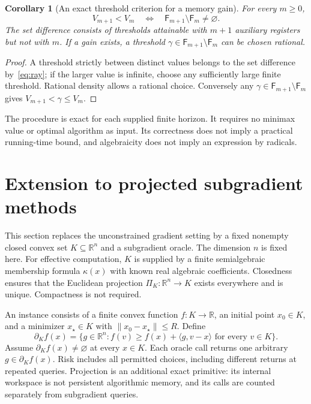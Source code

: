 \documentclass[11pt]{article}
\numberwithin{equation}{section}
\newtheorem{corollary}[theorem]{Corollary}
\theoremstyle{definition}
\newcommand{\R}{\mathbb R}
\begin{document}
\begin{corollary}[An exact threshold criterion for a memory gain]\label{cor:gain}
For every $m\ge0$,
\begin{equation}
 V_{m+1}<V_m
 \quad\Longleftrightarrow\quad
 \mathsf F_{m+1}\setminus \mathsf F_m\ne\varnothing.
 \label{eq:gain}
\end{equation}
The set difference consists of thresholds attainable with $m+1$ auxiliary registers but not with $m$. If a gain exists, a threshold $\gamma\in \mathsf F_{m+1}\setminus \mathsf F_m$ can be chosen rational.
\end{corollary}
\begin{proof}
A threshold strictly between distinct values belongs to the set difference by~\eqref{eq:ray}; if the larger value is infinite, choose any sufficiently large finite threshold. Rational density allows a rational choice. Conversely any $\gamma\in \mathsf F_{m+1}\setminus \mathsf F_m$ gives $V_{m+1}<\gamma\le V_m$.
\end{proof}

The procedure is exact for each supplied finite horizon. It requires no minimax value or optimal algorithm as input. Its correctness does not imply a practical running-time bound, and algebraicity does not imply an expression by radicals.

\section{Extension to projected subgradient methods}
\label{sec:projected}
This section replaces the unconstrained gradient setting by a fixed nonempty closed convex set $K\subseteq\R^n$ and a subgradient oracle. The dimension $n$ is fixed here. For effective computation, $K$ is supplied by a finite semialgebraic membership formula $\kappa(x)$ with known real algebraic coefficients. Closedness ensures that the Euclidean projection $\Pi_K:\R^n\to K$ exists everywhere and is unique. Compactness is not required.

An instance consists of a finite convex function $f:K\to\R$, an initial point $x_0\in K$, and a minimizer $x_\star\in K$ with $\|x_0-x_\star\|\le R$. Define
\[
 \partial_K f(x)=\{g\in\R^n:
 f(v)\ge f(x)+\langle g,v-x\rangle\text{ for every }v\in K\}.
\]
Assume $\partial_K f(x)\ne\varnothing$ at every $x\in K$. Each oracle call returns one arbitrary $g\in\partial_K f(x)$. Risk includes all permitted choices, including different returns at repeated queries. Projection is an additional exact primitive: its internal workspace is not persistent algorithmic memory, and its calls are counted separately from subgradient queries.
\end{document}

